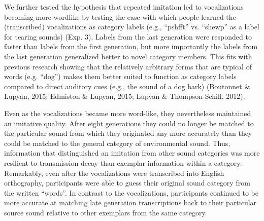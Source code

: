 \documentclass[english,floatsintext,man]{apa6}
\theoremstyle{definition}
\theoremstyle{definition}
\theoremstyle{definition}
\theoremstyle{remark}
\begin{document}
We further tested the hypothesis that repeated imitation led to
vocalizations becoming more wordlike by testing the ease with which
people learned the (transcribed) vocalizations as category labels (e.g.,
\enquote{pshfft} vs. \enquote{shewp} as a label for tearing sounds)
(Exp. 3). Labels from the last generation were responded to faster than
labels from the first generation, but more importantly the labels from
the last generation generalized better to novel category members. This
fits with previous research showing that the relatively arbitrary forms
that are typical of words (e.g. \enquote{dog}) makes them better suited
to function as category labels compared to direct auditory cues (e.g.,
the sound of a dog bark) (Boutonnet \& Lupyan, 2015; Edmiston \& Lupyan,
2015; Lupyan \& Thompson-Schill, 2012).

Even as the vocalizations became more word-like, they nevertheless
maintained an imitative quality. After eight generations they could no
longer be matched to the particular sound from which they originated any
more accurately than they could be matched to the general category of
environmental sound. Thus, information that distinguished an imitation
from other sound categories was more resilient to transmission decay
than exemplar information within a category. Remarkably, even after the
vocalizations were transcribed into English orthography, participants
were able to guess their original sound category from the written
\enquote{words}. In contrast to the vocalizations, participants
continued to be more accurate at matching late generation transcriptions
back to their particular source sound relative to other exemplars from
the same category.
\end{document}
